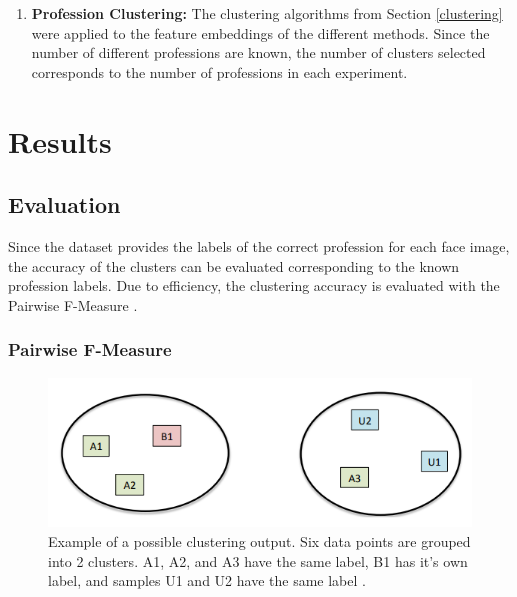 \documentclass[12pt,english]{article}
\begin{document}
\begin{enumerate}
\item \textbf{Profession Clustering: } The clustering algorithms from Section \ref{clustering} were applied to the feature embeddings of the different methods. Since the number of different professions are known, the number of clusters selected corresponds to the number of professions in each experiment.
\end{enumerate}

\section{Results}

\subsection{Evaluation}
\quad
Since the dataset provides the labels of the correct profession for each face image, the accuracy of the clusters can be evaluated corresponding to the known profession labels. Due to efficiency, the clustering accuracy is evaluated with the Pairwise F-Measure \cite{otto}.

\subsubsection{Pairwise F-Measure}

\begin{figure}[!tbp]
 \centering
    \includegraphics[width=\columnwidth]{figures/fmeasure.png}
    \caption{Example of a possible clustering output. Six data points are grouped into 2 clusters. A1, A2, and A3 have the same label, B1 has it's own label, and samples U1 and U2 have the same label \cite{otto}.}
    \label{fig:fmeasure}
\end{figure}
\end{document}
